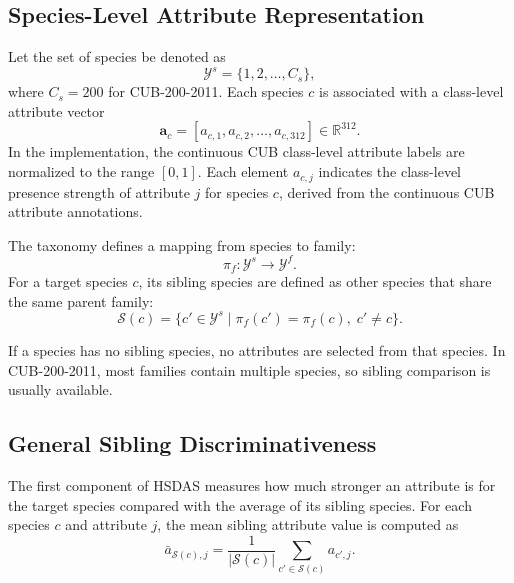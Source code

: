 \subsection{Species-Level Attribute Representation}

Let the set of species be denoted as
\begin{equation}
    \mathcal{Y}^{s} = \{1, 2, \ldots, C_s\},
\end{equation}
where \(C_s = 200\) for CUB-200-2011. Each species \(c\) is associated with a class-level attribute vector
\begin{equation}
    \mathbf{a}_c =
    [a_{c,1}, a_{c,2}, \ldots, a_{c,312}]
    \in \mathbb{R}^{312}.
\end{equation}
In the implementation, the continuous CUB class-level attribute labels are normalized to the range \([0,1]\). Each element \(a_{c,j}\) indicates the class-level presence strength of attribute \(j\) for species \(c\), derived from the continuous CUB attribute annotations.

The taxonomy defines a mapping from species to family:
\begin{equation}
    \pi_f: \mathcal{Y}^{s} \rightarrow \mathcal{Y}^{f}.
\end{equation}
For a target species \(c\), its sibling species are defined as other species that share the same parent family:
\begin{equation}
    \mathcal{S}(c)
    =
    \{c' \in \mathcal{Y}^{s}
    \mid
    \pi_f(c') = \pi_f(c),\; c' \neq c \}.
\end{equation}

If a species has no sibling species, no attributes are selected from that species. In CUB-200-2011, most families contain multiple species, so sibling comparison is usually available.

\subsection{General Sibling Discriminativeness}

The first component of HSDAS measures how much stronger an attribute is for the target species compared with the average of its sibling species. For each species \(c\) and attribute \(j\), the mean sibling attribute value is computed as
\begin{equation}
    \bar{a}_{\mathcal{S}(c),j}
    =
    \frac{1}{|\mathcal{S}(c)|}
    \sum_{c' \in \mathcal{S}(c)}
    a_{c',j}.
\end{equation}

